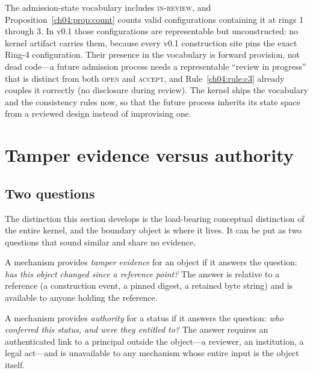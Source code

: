 \begin{remark}\label{ch04:rem:transitional}
The admission-state vocabulary includes \textsc{in-review}, and
Proposition~\ref{ch04:prop:count} counts valid configurations containing
it at rings 1 through 3. In v0.1 those configurations are representable
but unconstructed: no kernel artifact carries them, because every v0.1
construction site pins the exact Ring-4 configuration. Their presence in
the vocabulary is forward provision, not dead code---a future admission
process needs a representable ``review in progress'' that is distinct
from both \textsc{open} and \textsc{accept}, and
Rule~\ref{ch04:rule:c3} already couples it correctly (no disclosure
during review). The kernel ships the vocabulary and the consistency
rules now, so that the future process inherits its state space from a
reviewed design instead of improvising one.
\end{remark}

\section{Tamper evidence versus authority}\label{ch04:tamper}

\subsection{Two questions}

The distinction this section develops is the load-bearing conceptual
distinction of the entire kernel, and the boundary object is where it lives.
It can be put as two questions that sound similar and share no evidence.

\begin{definition}\label{ch04:def:tamper}
A mechanism provides \emph{tamper evidence} for an object if it answers the
question: \emph{has this object changed since a reference point?} The answer
is relative to a reference (a construction event, a pinned digest, a retained
byte string) and is available to anyone holding the reference.
\end{definition}

\begin{definition}[Authority]\label{ch04:def:authority}
A mechanism provides \emph{authority} for a status if it answers the
question: \emph{who conferred this status, and were they entitled to?} The
answer requires an authenticated link to a principal outside the object---a
reviewer, an institution, a legal act---and is unavailable to any mechanism
whose entire input is the object itself.
\end{definition}

